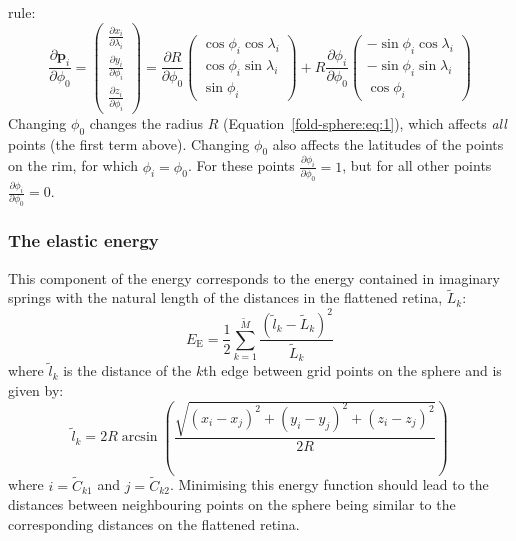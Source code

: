 \documentclass{article}
\newcommand{\EE}{\ensuremath{E_\mathrm{E}}\xspace}
\renewcommand{\vec}[1]{\mathbf{#1}}
\begin{document}
rule:
\begin{equation}
  \frac{\partial\vec{p}_i}{\partial\phi_0} = 
  \left(
    \begin{array}{c}
      \frac{\partial x_i}{\partial\lambda_i}\\ \frac{\partial y_i}{\partial\phi_i}\\ \frac{\partial z_i}{\partial\phi_i}
    \end{array}
  \right) =
  \frac{\partial R}{\partial \phi_0}\left(
    \begin{array}{c}
      \cos\phi_i\cos\lambda_i \\
      \cos\phi_i\sin\lambda_i \\
      \sin\phi_i 
    \end{array}\right)
  +
  R\frac{\partial\phi_i}{\partial\phi_0}\left(
    \begin{array}{c}
      -\sin\phi_i\cos\lambda_i \\
      -\sin\phi_i\sin\lambda_i \\
      \cos\phi_i 
    \end{array}\right)
\end{equation}
Changing $\phi_0$ changes the radius $R$
(Equation~\ref{fold-sphere:eq:1}), which affects \emph{all} points
(the first term above). Changing $\phi_0$ also affects the latitudes
of the points on the rim, for which $\phi_i=\phi_0$. For these points
$\frac{\partial \phi_i}{\partial\phi_0}=1$, but for all other points
$\frac{\partial \phi_i}{\partial\phi_0}=0$.

\subsubsection{The elastic energy}
\label{fold-sphere:sec:elastic-force}

This component of the energy corresponds to the energy contained in
imaginary springs with the natural length of the distances in the
flattened retina, $\tilde L_k$:
\begin{equation}
  \label{fold-sphere:eq:5}
  \EE  = \frac{1}{2} \sum_{k=1}^{\tilde M} \frac{(\tilde l_k- \tilde
    L_k)^2}{\tilde L_k}
\end{equation}
where $\tilde l_k$ is the distance of the $k$th edge between grid points on
the sphere and is given by:
\begin{equation}
  \label{fold-sphere:eq:2}
  \tilde l_k = 2R\arcsin\left(\frac{\sqrt{(x_i-x_j)^2 + (y_i-y_j)^2 + (z_i-z_j)^2}}{2R}\right)
\end{equation}
where $i=\tilde C_{k1}$ and $j=\tilde C_{k2}$.  Minimising this energy
function should lead to the distances between neighbouring points on
the sphere being similar to the corresponding distances on the
flattened retina.
\end{document}
